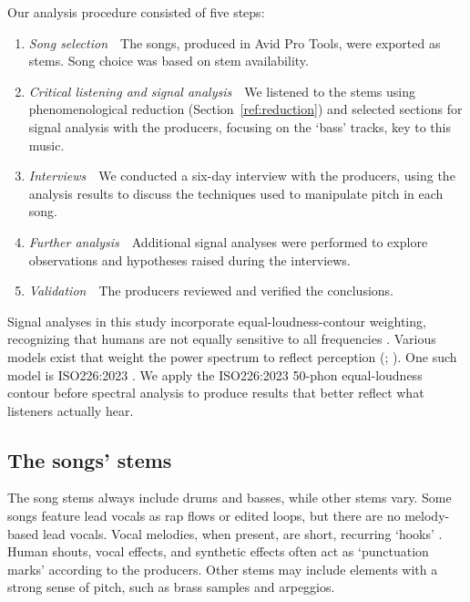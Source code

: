 \documentclass{article}
\begin{document}
Our analysis procedure consisted of five steps:

\begin{enumerate}[noitemsep]

	\item {\em Song selection}$\quad$The songs, produced in Avid Pro Tools, were exported as stems. Song choice was based on stem availability.
	\item {\em Critical listening and signal analysis}$\quad$We listened to the stems using phenomenological reduction (Section~\ref{ref:reduction}) and selected sections for signal analysis with the producers, focusing on the `bass' tracks, key to this music.
	\item {\em Interviews}$\quad$We conducted a six-day interview with the producers, using the analysis results to discuss the techniques used to manipulate pitch in each song.
	\item {\em Further analysis}$\quad$Additional signal analyses were performed to explore observations and hypotheses raised during the interviews.
	\item {\em Validation}$\quad$The producers reviewed and verified the conclusions.
	
\end{enumerate}

Signal analyses in this study incorporate equal-loudness-contour weighting, recognizing that humans are not equally sensitive to all frequencies \citep{fletcher1933loudness}. Various models exist that weight the power spectrum to reflect perception (\citealt{fletcher1933loudness,robinson1956re}; \citealt[p.~7]{skovenborg2004evaluation}). One such model is ISO226:2023 \citep{iso2262023}. We apply the ISO226:2023 50-phon equal-loudness contour before spectral analysis to produce results that better reflect what listeners actually hear.


\subsection{The songs' stems}

The song stems always include drums and basses, while other stems vary. Some songs feature lead vocals as rap flows or edited loops, but there are no melody-based lead vocals. Vocal melodies, when present, are short, recurring `hooks' \citep[p.~58]{delson1980dictionary}. Human shouts, vocal effects, and synthetic effects often act as `punctuation marks' according to the producers. Other stems may include elements with a strong sense of pitch, such as brass samples and arpeggios.
\end{document}
